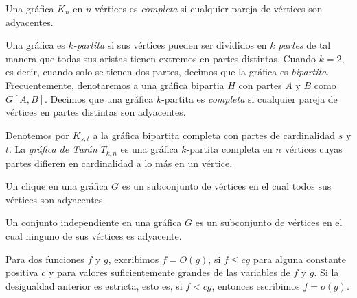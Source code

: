 \begin{definition}
  Una gráfica $K_n$ en $n$ vértices es \textit{completa} si cualquier pareja
  de vértices son adyacentes.
\end{definition}

\begin{definition}
  Una gráfica es \textit{$k$-partita} si sus vértices pueden ser divididos
  en $k$ \textit{partes} de tal manera que todas sus aristas tienen extremos en
  partes distintas. Cuando $k=2$, es decir, cuando solo se tienen dos partes,
  decimos que la gráfica es \textit{bipartita}.
  Frecuentemente, denotaremos a una gráfica bipartia $H$
  con partes $A$ y $B$ como $G[A, B]$. Decimos que una gráfica
  $k$-partita es \textit{completa} si cualquier pareja de vértices en
  partes distintas son adyacentes.
\end{definition}

\begin{definition}
  Denotemos por $K_{s, t}$ a la gráfica bipartita completa con partes
  de cardinalidad $s$ y $t$. La \textit{gráfica de Turán} $T_{k, n}$ es
  una gráfica $k$-partita completa en $n$ vértices cuyas partes
  difieren en cardinalidad a lo más en un vértice.
\end{definition}

\begin{definition}[clique]
  Un clique en una gráfica $G$ es un subconjunto de vértices en el
  cual todos sus vértices son adyacentes.
\end{definition}

\begin{definition}
  Un conjunto independiente en una gráfica $G$ es un subconjunto de
  vértices en el cual ninguno de sus vértices es adyacente.
\end{definition}

\begin{definition}
  Para dos funciones $f$ y $g$, excribimos $f = O(g)$, si $f \leq c g$
  para alguna constante positiva $c$ y para valores suficientemente grandes de
  las variables de $f$ y $g$. Si la desigualdad anterior es estricta,
  esto es, si $f < cg$, entonces escribimos $f = o(g)$.
\end{definition}
